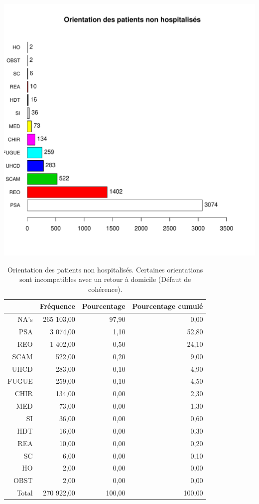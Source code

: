 \documentclass[12pt,english,french,twoside]{book}\usepackage[]{graphicx}\usepackage[]{color}
\makeatletter
\def\maxwidth{ %
  \ifdim\Gin@nat@width>\linewidth
    \linewidth
  \else
    \Gin@nat@width
  \fi
}
\makeatother
\begin{document}
\includegraphics[width=\maxwidth]{figure/fausses_sorties-1} 
\begin{table}[ht]
\centering
\begin{tabular}{rrrr}
  \hline
 & Fréquence & Pourcentage & Pourcentage cumulé \\ 
  \hline
NA's & 265 103,00 & 97,90 & 0,00 \\ 
  PSA & 3 074,00 & 1,10 & 52,80 \\ 
  REO & 1 402,00 & 0,50 & 24,10 \\ 
  SCAM & 522,00 & 0,20 & 9,00 \\ 
  UHCD & 283,00 & 0,10 & 4,90 \\ 
  FUGUE & 259,00 & 0,10 & 4,50 \\ 
  CHIR & 134,00 & 0,00 & 2,30 \\ 
  MED & 73,00 & 0,00 & 1,30 \\ 
  SI & 36,00 & 0,00 & 0,60 \\ 
  HDT & 16,00 & 0,00 & 0,30 \\ 
  REA & 10,00 & 0,00 & 0,20 \\ 
  SC & 6,00 & 0,00 & 0,10 \\ 
  HO & 2,00 & 0,00 & 0,00 \\ 
  OBST & 2,00 & 0,00 & 0,00 \\ 
    Total & 270 922,00 & 100,00 & 100,00 \\ 
   \hline
\end{tabular}
\caption[Orientation des patients non hospitalisés]{Orientation des patients non hospitalisés. Certaines orientations sont incompatibles avec un retour à domicile (Défaut de cohérence).} 
\label{tab:orient_nh}
\end{table}
\end{document}
